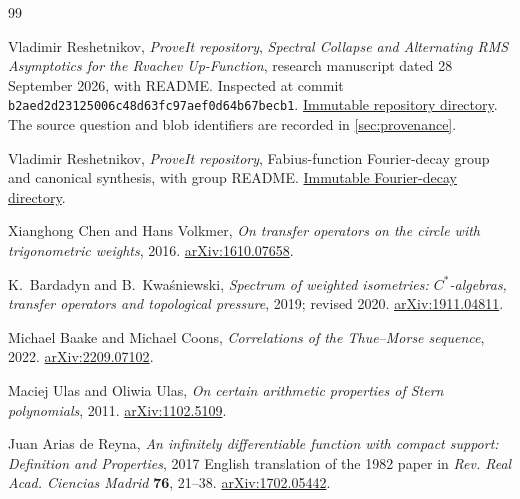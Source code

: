 \documentclass[11pt,a4paper]{article}
\theoremstyle{definition}
\theoremstyle{remark}
\numberwithin{equation}{section}
\begin{document}
\begin{thebibliography}{99}

Vladimir Reshetnikov, \emph{ProveIt repository},
\emph{Spectral Collapse and Alternating RMS Asymptotics for the Rvachev
Up-Function}, research manuscript dated 28 September 2026, with README.
Inspected at commit
\texttt{b2aed2d23125006c48d63fc97aef0d64b67becb1}.
\href{https://github.com/VladimirReshetnikov/ProveIt/tree/b2aed2d23125006c48d63fc97aef0d64b67becb1/Analysis/FabiusFunction/docs/semi-formalized-research-frontiers/drafts/rvachev_up_fourier_decay/Spectral_Collapse_Alternating_RMS}{Immutable repository directory}.
The source question and blob identifiers are recorded in
\cref{sec:provenance}.

Vladimir Reshetnikov, \emph{ProveIt repository}, Fabius-function Fourier-decay
group and canonical synthesis, with group README.
\href{https://github.com/VladimirReshetnikov/ProveIt/tree/b2aed2d23125006c48d63fc97aef0d64b67becb1/Analysis/FabiusFunction/docs/semi-formalized-research-frontiers/drafts/rvachev_up_fourier_decay}{Immutable Fourier-decay directory}.

Xianghong Chen and Hans Volkmer,
\emph{On transfer operators on the circle with trigonometric weights},
2016. \href{https://arxiv.org/abs/1610.07658}{arXiv:1610.07658}.

K.~Bardadyn and B.~Kwa\'sniewski,
\emph{Spectrum of weighted isometries: $C^*$-algebras, transfer operators
and topological pressure}, 2019; revised 2020.
\href{https://arxiv.org/abs/1911.04811}{arXiv:1911.04811}.

Michael Baake and Michael Coons,
\emph{Correlations of the Thue--Morse sequence}, 2022.
\href{https://arxiv.org/abs/2209.07102}{arXiv:2209.07102}.

Maciej Ulas and Oliwia Ulas,
\emph{On certain arithmetic properties of Stern polynomials}, 2011.
\href{https://arxiv.org/abs/1102.5109}{arXiv:1102.5109}.

Juan Arias de Reyna,
\emph{An infinitely differentiable function with compact support:
Definition and Properties}, 2017 English translation of the 1982 paper
in \emph{Rev. Real Acad. Ciencias Madrid} \textbf{76}, 21--38.
\href{https://arxiv.org/abs/1702.05442}{arXiv:1702.05442}.

\end{thebibliography}
\end{document}
